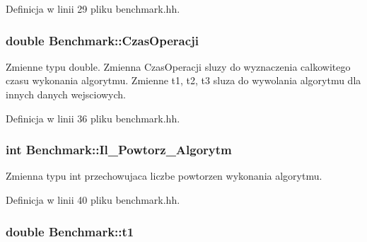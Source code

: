 \-Definicja w linii 29 pliku benchmark.\-hh.

\hypertarget{class_benchmark_accd4af9649210ce216db513c0676c401}{
\subsubsection[{\-Czas\-Operacji}]{\setlength{\rightskip}{0pt plus 5cm}double {\bf \-Benchmark\-::\-Czas\-Operacji}}}\label{class_benchmark_accd4af9649210ce216db513c0676c401}


\-Zmienne typu double. \-Zmienna \-Czas\-Operacji sluzy do wyznaczenia calkowitego czasu wykonania algorytmu. \-Zmienne t1, t2, t3 sluza do wywolania algorytmu dla innych danych wejsciowych. 



\-Definicja w linii 36 pliku benchmark.\-hh.

\hypertarget{class_benchmark_a95ab47ba15d3d517124eecc26a81cf4c}{
\subsubsection[{\-Il\-\_\-\-Powtorz\-\_\-\-Algorytm}]{\setlength{\rightskip}{0pt plus 5cm}int {\bf \-Benchmark\-::\-Il\-\_\-\-Powtorz\-\_\-\-Algorytm}}}\label{class_benchmark_a95ab47ba15d3d517124eecc26a81cf4c}


\-Zmienna typu int przechowujaca liczbe powtorzen wykonania algorytmu. 



\-Definicja w linii 40 pliku benchmark.\-hh.

\hypertarget{class_benchmark_a2f372ced372c00f69e033a117697ec54}{
\subsubsection[{t1}]{\setlength{\rightskip}{0pt plus 5cm}double {\bf \-Benchmark\-::t1}}}\label{class_benchmark_a2f372ced372c00f69e033a117697ec54}


